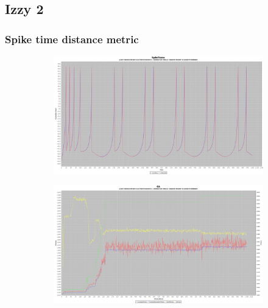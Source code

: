 \documentclass[12pt]{article}
\begin{document}
	\subsection{Izzy 2}
		\subsubsection{Spike time distance metric}
			\begin{figure}[H]
				\centering
					\begin{subfigure}{.5\textwidth}
						\centering
						\includegraphics[width=\linewidth]{./../images/izzy2/time/plot.png}
						
						\label{fig:sub4a}
					\end{subfigure}%
					\begin{subfigure}{.5\textwidth}
						\centering
						\includegraphics[width=\linewidth]{./../images/izzy2/time/prog.png}
						
						\label{fig:sub4b}
					\end{subfigure}
					
					\label{fig:plot4}
			\end{figure}
			
\end{document}
